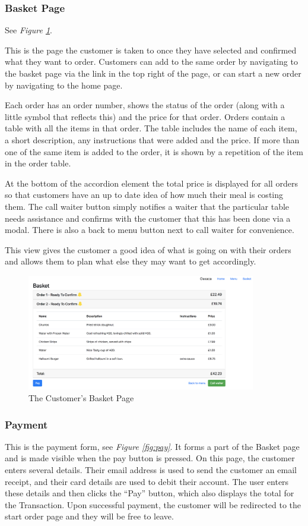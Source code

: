 \documentclass[12pt, twoside, a4paper]{report}
\begin{document}
\subsubsection*{Basket Page} 

See \textit{Figure \ref{fig:basket}}.

This is the page the customer is taken to once they have selected and confirmed what they want to order. Customers can add to the same order by navigating to the basket page via the link in the top right of the page, or can start a new order by navigating to the home page.

Each order has an order number, shows the status of the order (along with a little symbol that reflects this) and the price for that order. Orders contain a table with all the items in that order. The table includes the name of each item, a short description, any instructions that were added and the price. If more than one of the same item is added to the order, it is shown by a repetition of the item in the order table.

At the bottom of the accordion element the total price is displayed for all orders so that customers have an up to date idea of how much their meal is costing them. The call waiter button simply notifies a waiter that the particular table needs assistance and confirms with the customer that this has been done via a modal. There is also a back to menu button next to call waiter for convenience.

This view gives the customer a good idea of what is going on with their orders and allows them to plan what else they may want to get accordingly.

\begin{figure}[H]
  \centering
  \includegraphics[width=10cm]{basket.png}
  \caption{The Customer's Basket Page}
  \label{fig:basket}
\end{figure}

\subsubsection*{Payment}
This is the payment form, see \textit{Figure \ref{fig:pay}}. It forms a part of the Basket page and is made visible when the pay button is pressed.
On this page, the customer enters several details. Their email address is used to send the customer an email receipt, and their card details are used to debit their account.
The user enters these details and then clicks the “Pay” button, which also displays the total for the Transaction.
Upon successful payment, the customer will be redirected to the start order page and they will be free to leave.
\end{document}
